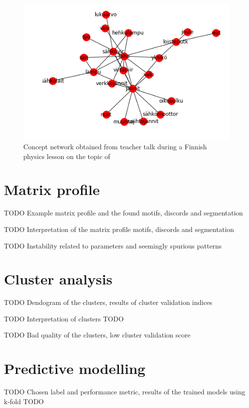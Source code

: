 \documentclass[utf8,english]{gradu3}
\begin{document}
\begin{figure}
  \includegraphics[width=\linewidth]{../figures/graph1.png}
  \caption{Concept network obtained from teacher talk during a Finnish physics lesson on the topic of }
  \label{fig:graph1}
\end{figure}

\section{Matrix profile}

TODO Example matrix profile and the found motifs, discords and segmentation

TODO Interpretation of the matrix profile motifs, discords and segmentation 

TODO Instability related to parameters and seemingly spurious patterns

\section{Cluster analysis}

TODO Dendogram of the clusters, results of cluster validation indices

TODO Interpretation of clusters TODO

TODO Bad quality of the clusters, low cluster validation score

\section{Predictive modelling}

TODO Chosen label and performance metric, results of the trained models using k-fold TODO
\end{document}

